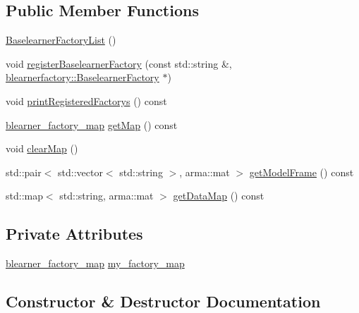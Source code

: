 \subsection*{Public Member Functions}
\begin{DoxyCompactItemize}
\item 
\mbox{\hyperlink{classblearnerlist_1_1_baselearner_factory_list_a438e2cfeecfdecaff27624225819f99b}{Baselearner\+Factory\+List}} ()
\item 
void \mbox{\hyperlink{classblearnerlist_1_1_baselearner_factory_list_a6f5d8eb26f5f5ae4856d62eb9d649f4f}{register\+Baselearner\+Factory}} (const std\+::string \&, \mbox{\hyperlink{classblearnerfactory_1_1_baselearner_factory}{blearnerfactory\+::\+Baselearner\+Factory}} $\ast$)
\item 
void \mbox{\hyperlink{classblearnerlist_1_1_baselearner_factory_list_a1d0242c96044f78c448183ed4a97e079}{print\+Registered\+Factorys}} () const
\item 
\mbox{\hyperlink{baselearner__factory__list_8h_a058570e00ae11b882cfed36eb40be025}{blearner\+\_\+factory\+\_\+map}} \mbox{\hyperlink{classblearnerlist_1_1_baselearner_factory_list_aeb573190a689af611e2f80ca8ed65d95}{get\+Map}} () const
\item 
void \mbox{\hyperlink{classblearnerlist_1_1_baselearner_factory_list_aacbe97968ca672d2481d5f8dce0bbf94}{clear\+Map}} ()
\item 
std\+::pair$<$ std\+::vector$<$ std\+::string $>$, arma\+::mat $>$ \mbox{\hyperlink{classblearnerlist_1_1_baselearner_factory_list_a1f0d601a978c0f50cf9b6228c1f92ce8}{get\+Model\+Frame}} () const
\item 
std\+::map$<$ std\+::string, arma\+::mat $>$ \mbox{\hyperlink{classblearnerlist_1_1_baselearner_factory_list_aeb83b67769e5fb34e7acc14c7e651dfc}{get\+Data\+Map}} () const
\end{DoxyCompactItemize}
\subsection*{Private Attributes}
\begin{DoxyCompactItemize}
\item 
\mbox{\hyperlink{baselearner__factory__list_8h_a058570e00ae11b882cfed36eb40be025}{blearner\+\_\+factory\+\_\+map}} \mbox{\hyperlink{classblearnerlist_1_1_baselearner_factory_list_a839e9b3f1bf73e995c35f7a6d0f64113}{my\+\_\+factory\+\_\+map}}
\end{DoxyCompactItemize}


\subsection{Constructor \& Destructor Documentation}
\mbox{\label{classblearnerlist_1_1_baselearner_factory_list_a438e2cfeecfdecaff27624225819f99b}} 
